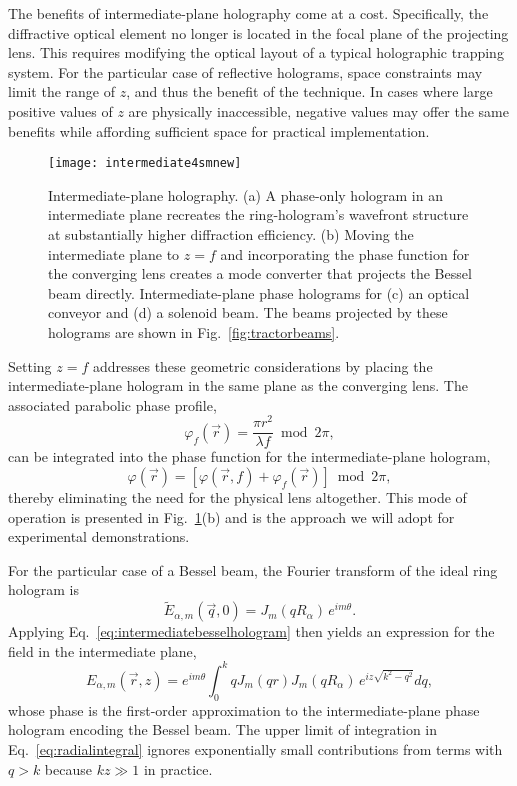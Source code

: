 The benefits of intermediate-plane holography come at
a cost.  Specifically, the diffractive optical element no
longer is located in the focal plane of the projecting
lens.  This requires modifying the optical layout of a typical
holographic trapping system.
For the particular case of reflective holograms,
space constraints may limit the range of $z$,
and thus the benefit of the technique.
In cases where large positive values of $z$ are 
physically inaccessible,
negative values may offer the same benefits while
affording sufficient space for practical implementation.

\begin{figure}[t!]
  \centering
  \texttt{[image: intermediate4smnew]}
  \caption{Intermediate-plane holography. 
    (a) A phase-only hologram
    in an intermediate plane recreates the ring-hologram's
    wavefront structure at substantially higher diffraction efficiency.
    (b) Moving the intermediate plane to $z = f$ and incorporating
    the phase function for the converging lens
    creates a mode converter that projects the Bessel beam directly.
    Intermediate-plane phase holograms for
    (c) an optical conveyor and (d) a solenoid beam.  The beams
    projected by these holograms are shown in Fig.~\ref{fig:tractorbeams}.}
  \label{fig:intermediate}
\end{figure}

Setting $z = f$ addresses these geometric considerations
by placing the intermediate-plane hologram
in the same plane as the converging lens.
The associated parabolic phase profile,
\begin{equation}
  \label{eq:lensphase}
  \varphi_f(\vec{r}) = \frac{\pi r^2}{\lambda f}
  \bmod 2 \pi,
\end{equation}
can be integrated into the phase function
for the intermediate-plane hologram, 
\begin{equation}
  \label{eq:complete}
  \varphi(\vec{r}) 
  =
  \left[\varphi(\vec{r},f) +
  \varphi_f(\vec{r}) \right]
  \bmod 2 \pi, 
\end{equation}
thereby eliminating the need for
the physical lens altogether.
This mode of operation is presented in
Fig.~\ref{fig:intermediate}(b) and is the
approach we will adopt for experimental demonstrations.

For the particular case of a Bessel beam,
the Fourier transform of the ideal ring hologram is
\begin{equation}
  \tilde{E}_{\alpha,m}(\vec{q},0)
  =
  J_m(qR_\alpha) \, e^{i m \theta}.
\end{equation}
Applying Eq.~\eqref{eq:intermediatebesselhologram}
then yields an expression for the field in the 
intermediate plane,
\begin{equation}
  \label{eq:radialintegral}
  E_{\alpha,m}(\vec{r},z)
  =
  e^{i m \theta}
  \int_0^k 
  q 
  J_m(q r) 
  J_m(qR_\alpha) \, 
  e^{i z \sqrt{k^2 - q^2}} dq ,
\end{equation}
whose phase is the first-order approximation to the
intermediate-plane phase hologram encoding the Bessel beam.
The upper limit of integration in Eq.~\eqref{eq:radialintegral}
ignores exponentially small contributions from terms with
$q > k$ because $kz \gg 1$ in practice. 

